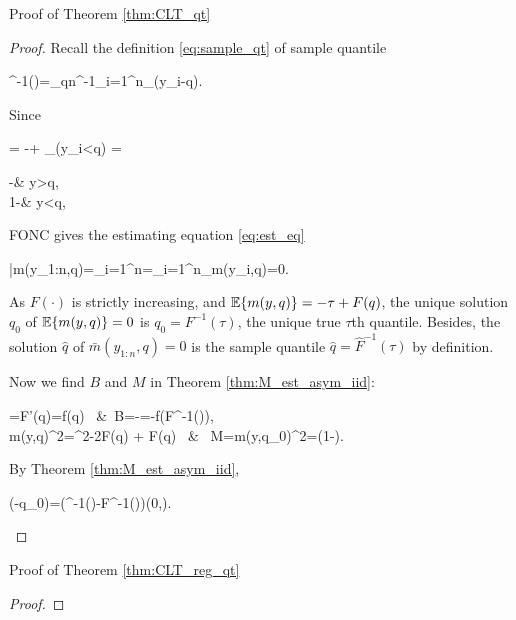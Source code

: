 \documentclass[10pt,a4paper]{book}
\begin{document}
\begin{pfbox}{Proof of Theorem \ref{thm:CLT_qt}}
	\begin{proof}
		Recall the definition \eqref{eq:sample_qt} of sample quantile
		\begin{sequation*}
			^{-1}(\tau)=\arg\min_{q\in{}}n^{-1}\sum_{i=1}^n\rho_\tau(y_i-q).
		\end{sequation*}
		Since 
		\begin{sequation*}
			= -\tau + \1_{(y_i<q)} = \begin{cases}
				-\tau &\text{ if } y>q,\\
				1-\tau &\text{ if } y<q,
			\end{cases}
		\end{sequation*} 
		FONC gives the estimating equation \eqref{eq:est_eq} 
		\begin{salign*}
			\bar{m}(y_{1:n},q)=\sum_{i=1}^{n}=\sum_{i=1}^{n}_{m(y_i,q)}=0.
		\end{salign*}
		As $F(\cdot)$ is strictly increasing, and $\mathbb E\{m(y,q)\}=-\tau+F(q)$,  the unique solution $q_0$ of $\mathbb E\{m(y,q)\}=0$ is $q_0=F^{-1}(\tau)$, the unique true $\tau$th quantile.
		Besides, the solution $\hat{q}$ of $\bar{m}(y_{1:n},q)=0$ is the sample quantile $\hat{q}=\hat{F}^{-1}(\tau)$ by definition.
		
		Now we find $B$ and $M$ in Theorem \ref{thm:M_est_asym_iid}:
		\begin{salign*}
			=F'(q)=f(q) \ &\Rightarrow \ B=-=-f(F^{-1}(\tau)), \\
			\bbE m(y,q)^2=\tau^2-2\tau F(q) + F(q) \ & \Rightarrow \ M=\bbE m(y,q_0)^2=\tau(1-\tau).
		\end{salign*}  
		By Theorem \ref{thm:M_est_asym_iid},
		\begin{sequation*}
			(-q_0)=(^{-1}(\tau)-F^{-1}(\tau))\dto \rmN\left(0,\right).
		\end{sequation*}
	\end{proof}
\end{pfbox}

\begin{pfbox}{Proof of Theorem \ref{thm:CLT_reg_qt}}
	\begin{proof}
	\end{proof}
\end{pfbox}
\end{document}
